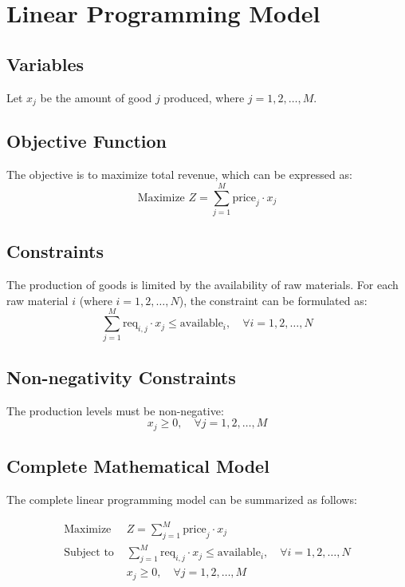 \documentclass{article}
\begin{document}
\section*{Linear Programming Model}

\subsection*{Variables}
Let \( x_j \) be the amount of good \( j \) produced, where \( j = 1, 2, \ldots, M \).

\subsection*{Objective Function}
The objective is to maximize total revenue, which can be expressed as:
\[
\text{Maximize } Z = \sum_{j=1}^{M} \text{price}_j \cdot x_j
\]

\subsection*{Constraints}
The production of goods is limited by the availability of raw materials. For each raw material \( i \) (where \( i = 1, 2, \ldots, N \)), the constraint can be formulated as:
\[
\sum_{j=1}^{M} \text{req}_{i,j} \cdot x_j \leq \text{available}_i, \quad \forall i = 1, 2, \ldots, N
\]

\subsection*{Non-negativity Constraints}
The production levels must be non-negative:
\[
x_j \geq 0, \quad \forall j = 1, 2, \ldots, M
\]

\subsection*{Complete Mathematical Model}
The complete linear programming model can be summarized as follows:

\begin{align*}
\text{Maximize } & Z = \sum_{j=1}^{M} \text{price}_j \cdot x_j \\
\text{Subject to } & \sum_{j=1}^{M} \text{req}_{i,j} \cdot x_j \leq \text{available}_i, \quad \forall i = 1, 2, \ldots, N \\
& x_j \geq 0, \quad \forall j = 1, 2, \ldots, M
\end{align*}
\end{document}
